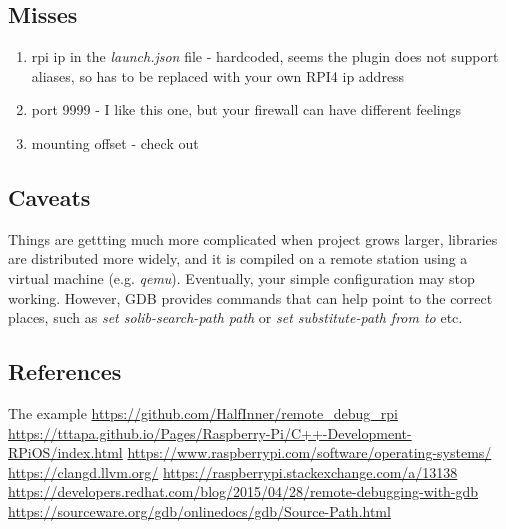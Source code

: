 \documentclass[twocolumn, 10pt]{article}
\begin{document}
\subsection*{Misses}
\begin{enumerate}
  \item rpi ip in the \textit{launch.json} file - hardcoded, seems the plugin does not support aliases,
        so has to be replaced with your own RPI4 ip address
  \item port 9999 - I like this one, but your firewall can have different feelings
  \item mounting offset - check \cite{bib:mounting-approach} out
\end{enumerate}

\subsection*{Caveats}
Things are gettting much more complicated when project grows larger,
  libraries are distributed more widely, and it is compiled on a remote
  station using a virtual machine (e.g. \textit{qemu}). Eventually,
  your simple configuration may stop working. However,
  GDB provides commands that can help point to the correct places,
  such as \textit{set solib-search-path path} or
  \textit{set substitute-path from to} etc.\cite{bib:gdb-additional-configs}


\subsection*{References}
\begin{enumerate}[label={[\arabic*]}]
  \tiny
   The example \url{https://github.com/HalfInner/remote_debug_rpi}
   \url{https://tttapa.github.io/Pages/Raspberry-Pi/C++-Development-RPiOS/index.html}
   \url{https://www.raspberrypi.com/software/operating-systems/}
   \url{https://clangd.llvm.org/}
   \url{https://raspberrypi.stackexchange.com/a/13138}
   \url{https://developers.redhat.com/blog/2015/04/28/remote-debugging-with-gdb}
   \url{https://sourceware.org/gdb/onlinedocs/gdb/Source-Path.html}
\end{enumerate}
\end{document}
